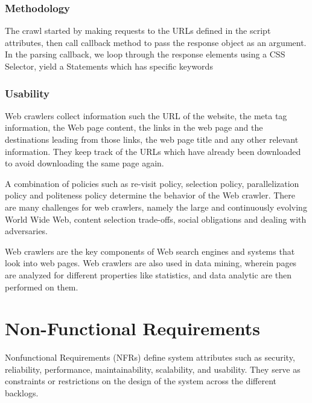 \documentclass{scrreprt}
\begin{document}
\subsection{Methodology}

The crawl started by making requests to the URLs defined in the script attributes, then call callback method to pass the response object as an argument. In the parsing callback, we loop through the response elements using a CSS Selector, yield a Statements which has specific keywords



\subsection{Usability}
Web crawlers collect information such the URL of the website, the meta tag information, the Web page content, the links in the web page and the destinations leading from those links, the web page title and any other relevant information. They keep track of the URLs which have already been downloaded to avoid downloading the same page again.

A combination of policies such as re-visit policy, selection policy, parallelization policy and politeness policy determine the behavior of the Web crawler. There are many challenges for web crawlers, namely the large and continuously evolving World Wide Web, content selection trade-offs, social obligations and dealing with adversaries.

Web crawlers are the key components of Web search engines and systems that look into web pages. Web crawlers are also used in data mining, wherein pages are analyzed for different properties like statistics, and data analytic are then performed on them.


\chapter{Non-Functional Requirements}
Nonfunctional Requirements (NFRs) define system attributes such as security, reliability, performance, maintainability, scalability, and usability. They serve as constraints or restrictions on the design of the system across the different backlogs.
\end{document}
